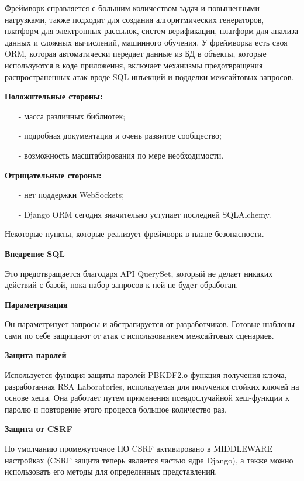Фреймворк справляется с большим количеством задач и повышенными нагрузками, также подходит для создания алгоритмических 
генераторов, платформ для электронных рассылок, систем верификации, платформ для анализа данных и сложных вычислений, машинного обучения.
У фреймворка есть своя ORM, которая автоматически передает данные из БД в объекты,
которые используются в коде приложения, включает механизмы предотвращения распространенных атак вроде SQL-инъекций 
и подделки межсайтовых запросов.

\textbf{Положительные стороны:}
\begin{itemize}
 \item[-] масса различных библиотек;
 \item[-] подробная документация и очень развитое сообщество;
 \item[-] возможность масштабирования по мере необходимости.
\end{itemize}

\textbf{Отрицательные стороны:}
\begin{itemize}
 \item[-] нет поддержки WebSockets;
 \item[-] Django ORM сегодня значительно уступает последней SQLAlchemy.
\end{itemize}

Некоторые пункты, которые реализует фреймворк в плане безопасности.

\textbf{Внедрение SQL}

Это предотвращается благодаря API QuerySet, который не делает никаких действий с базой,
пока набор запросов к ней не будет обработан. 

\textbf{Параметризация}

Он параметризует запросы и абстрагируется от разработчиков. Готовые шаблоны сами по себе защищают от атак с использованием межсайтовых сценариев.


\textbf{Защита паролей}

Используется функция защиты паролей PBKDF2.о функция получения ключа, разработанная
RSA Laboratories, используемая для получения стойких ключей на основе хеша. Она работает путем применения псевдослучайной хеш-функции к паролю
и повторение этого процесса большое количество раз.

\textbf{Защита от CSRF}

По умолчанию промежуточное ПО CSRF активировано в MIDDLEWARE настройках (CSRF защита теперь является частью ядра Django), а также можно использовать 
его методы для определенных представлений.


\newpage